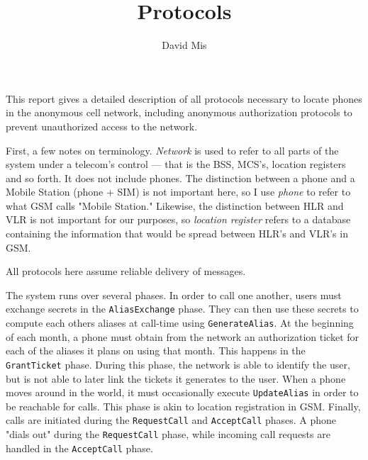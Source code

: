 \documentclass[11pt]{article}
\begin{document}
\title{Protocols}
\author{David Mis}

\maketitle

This report gives a detailed description of all protocols necessary to locate phones in the anonymous cell network, including anonymous authorization protocols to prevent unauthorized access to the network.  

First, a few notes on terminology. \emph{Network} is used to refer to all parts of the system under a telecom's control --- that is the BSS, MCS's, location registers and so forth. It does not include phones. The distinction between a phone and a Mobile Station (phone + SIM) is not important here, so I use \emph{phone} to refer to what GSM calls "Mobile Station." Likewise, the distinction between HLR and VLR is not important for our purposes, so \emph{location register} refers to a database containing the information that would be spread between HLR's and VLR's in GSM.

All protocols here assume reliable delivery of messages.

The system runs over several phases. In order to call one another, users must exchange secrets in the \texttt{AliasExchange} phase. They can then use these secrets to compute each others aliases at call-time using \texttt{GenerateAlias}. At the beginning of each month, a phone must obtain from the network an authorization ticket for each of the aliases it plans on using that month. This happens in the \texttt{GrantTicket} phase. During this phase, the network is able to identify the user, but is not able to later link the tickets it generates to the user. When a phone moves around in the world, it must occasionally execute \texttt{UpdateAlias} in order to be reachable for calls. This phase is akin to location registration in GSM. Finally, calls are initiated during the \texttt{RequestCall} and \texttt{AcceptCall} phases. A phone "dials out" during the \texttt{RequestCall} phase, while incoming call requests are handled in the \texttt{AcceptCall} phase.
\end{document}
